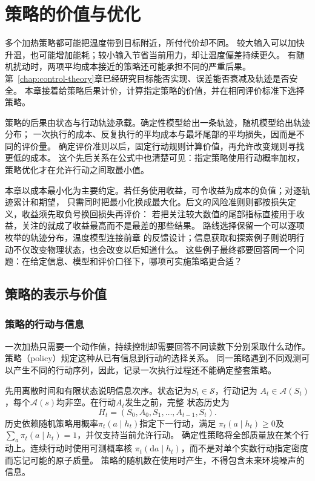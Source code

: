 \chapter{策略的价值与优化}
\label{chap:decision-theory-and-dynamic-risk}
\label{chap:policy-value-and-optimization}

多个加热策略都可能把温度带到目标附近，所付代价却不同。
较大输入可以加快升温，也可能增加能耗；较小输入节省当前用力，却让温度偏差持续更久。
有随机扰动时，两项平均成本接近的策略还可能承担不同的严重后果。
第~\ref{chap:control-theory}章已经研究目标能否实现、误差能否衰减及轨迹是否安全。
本章接着给策略后果计价，计算指定策略的价值，并在相同评价标准下选择策略。

策略的后果由状态与行动轨迹承载。确定性模型给出一条轨迹，随机模型给出轨迹分布；
一次执行的成本、反复执行的平均成本与最坏尾部的平均损失，因而是不同的评价量。
确定评价准则以后，固定行动规则计算价值，再允许改变规则寻找更低的成本。
这个先后关系在公式中也清楚可见：指定策略使用行动概率加权，策略优化才在允许行动之间取最小值。

本章以成本最小化为主要约定。若任务使用收益，可令收益为成本的负值；对逐轨迹累计和期望，
只需同时把最小化换成最大化。后文的风险准则则都按损失定义，收益须先取负号换回损失再评价：
若把关注较大数值的尾部指标直接用于收益，关注的就成了收益最高而不是最差的那些结果。
路线选择保留一个可以逐项枚举的轨迹分布，温度模型连接前章
的反馈设计；信息获取和探索例子则说明行动不仅改变物理状态，也会改变以后知道什么。
这些例子最终都要回答同一个问题：在给定信息、模型和评价口径下，哪项可实施策略更合适？

\section{策略的表示与价值}
\label{sec:policy-representation-and-value}

\subsection{策略的行动与信息}
\label{sec:policy-actions-and-information}

一次加热只需要一个动作值，持续控制却需要回答不同读数下分别采取什么动作。
策略（policy）规定这种从已有信息到行动的选择关系。
同一策略遇到不同观测可以产生不同的行动序列，因此，记录一次执行过程还不能确定整套策略。

先用离散时间和有限状态说明信息次序。状态记为$S_t\in\mathcal S$，行动记为
$A_t\in\mathcal A(S_t)$，每个$\mathcal A(s)$均非空。在行动$A_t$发生之前，完整
状态历史为
\[
  H_t=(S_0,A_0,S_1,\ldots,A_{t-1},S_t).
\]
历史依赖随机策略用概率$\pi_t(a\mid h_t)$指定下一行动，满足
$\pi_t(a\mid h_t)\geq0$及$\sum_a\pi_t(a\mid h_t)=1$，并仅支持当前允许行动。
确定性策略将全部质量放在某个行动上。连续行动时使用可测概率核
$\pi_t(\mathrm da\mid h_t)$，而不是对单个实数行动指定密度而忘记可能的原子质量。
策略的随机数在使用时产生，不得包含未来环境噪声的信息。

